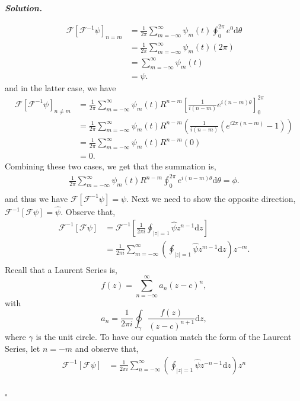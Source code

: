 \documentclass[12pt]{report}
\newenvironment{solution}[1][\it{Solution}]{\textbf{#1. } }{$\square$}
\begin{document}
\begin{solution}
\begin{enumerate}
        \begin{align*}
            \mathcal{F}[\mathcal{F}^{-1}\psi]_{n=m}&=\frac{1}{2\pi}\sum_{m=-\infty}^\infty\psi_m(t)\oint_0^{2\pi}e^0\mathrm{d}\theta\\
            &=\frac{1}{2\pi}\sum_{m=-\infty}^\infty\psi_m(t)(2\pi)\\
            &=\sum_{m=-\infty}^\infty\psi_m(t)\\
            &=\psi.
        \end{align*}
        and in the latter case, we have
        \begin{align*}
            \mathcal{F}[\mathcal{F}^{-1}\psi]_{n\neq m}&=\frac{1}{2\pi}\sum_{m=-\infty}^\infty\psi_m(t)R^{n-m}\left[\frac{1}{i(n-m)}e^{i(n-m)\theta}\right]_0^{2\pi}\\
            &=\frac{1}{2\pi}\sum_{m=-\infty}^\infty\psi_m(t)R^{n-m}\left(\frac{1}{i(n-m)}\left(e^{i2\pi(n-m)}-1\right)\right)\\
            &=\frac{1}{2\pi}\sum_{m=-\infty}^\infty\psi_m(t)R^{n-m}(0)\\
            &=0.
        \end{align*}
        Combining these two cases, we get that the summation is,
        \begin{align*}
            \frac{1}{2\pi}\sum_{m=-\infty}^\infty\psi_m(t)R^{n-m}\oint_0^{2\pi}e^{i(n-m)\theta}\mathrm{d}\theta = \phi.\\
        \end{align*}
        and thus we have $\mathcal{F}[\mathcal{F}^{-1}\psi]=\psi$. Next we need to show the opposite direction, $\mathcal{F}^{-1}[\mathcal{F}\psi]=\hat{\psi}$. Observe that,
        \begin{align*}
            \mathcal{F}^{-1}[\mathcal{F}\psi]&=\mathcal{F}^{-1}\left[\frac{1}{2\pi i}\oint_{|z|=1}\hat{\psi}z^{n-1}\mathrm{d}z\right]\\
            &=\frac{1}{2\pi i}\sum_{m=-\infty}^\infty\left(\oint_{|z|=1}\hat{\psi}z^{m-1}\mathrm{d}z\right)z^{-m}.\\
        \end{align*}
        Recall that a Laurent Series is,
        \[f(z)=\sum_{n=-\infty}^\infty a_n(z-c)^n,\] 
        with 
        \[a_n=\frac{1}{2\pi i}\oint_\gamma\frac{f(z)}{(z-c)^{n+1}}\mathrm{d}z,\] 
        where $\gamma$ is the unit circle. To have our equation match the form of the Laurent Series, let $n = -m$ and observe that,
        \begin{align*}
            \mathcal{F}^{-1}[\mathcal{F}\psi]&=\frac{1}{2\pi i}\sum_{n=-\infty}^\infty\left(\oint_{|z|=1}\hat{\psi}z^{-n-1}\mathrm{d}z\right)z^{n}\\

\end{align*}
\end{enumerate}
\end{solution}
\end{document}
